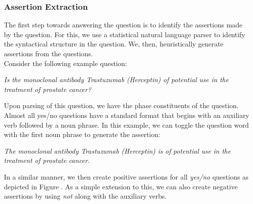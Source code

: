 \documentclass[11pt,a4paper]{article}
\begin{document}

\subsubsection{Assertion Extraction}

The first step towards answering the question is to identify the assertions made by the question. For this, we use a statistical natural language parser to identify the syntactical structure in the question. We, then, heuristically generate assertions from the questions.\\
Consider the following example question:

\textit{Is the monoclonal antibody Trastuzumab (Herceptin) of potential use in the treatment of prostate cancer?}

Upon parsing of this question, we have the phase constituents of the question. Almost all yes/no questions have a standard format that begins with an auxiliary verb followed by a noun phrase. In this example, we can toggle the question word with the first noun phrase to generate the assertion:

\textit{The monoclonal antibody Trastuzumab (Herceptin) is of potential use in the treatment of prostate cancer.}

In a similar manner, we then create positive assertions for all \textit{yes/no} questions as depicted in Figure . As a simple extension to this, we can also create negative assertions by using \textit{not} along with the auxiliary verbs.
\end{document}
